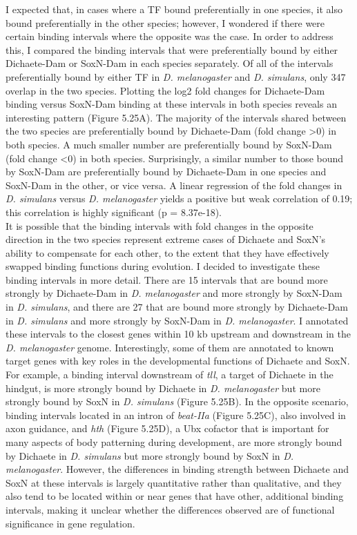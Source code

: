 I expected that, in cases where a TF bound preferentially in one species, it also bound preferentially in the other species; however, I wondered if there were certain binding intervals where the opposite was the case. In order to address this, I compared the binding intervals that were preferentially bound by either Dichaete-Dam or SoxN-Dam in each species separately. Of all of the intervals preferentially bound by either TF in \emph{D. melanogaster} and \emph{D. simulans}, only 347 overlap in the two species. Plotting the log2 fold changes for Dichaete-Dam binding versus SoxN-Dam binding at these intervals in both species reveals an interesting pattern (Figure 5.25A). The majority of the intervals shared between the two species are preferentially bound by Dichaete-Dam (fold change \textgreater 0) in both species. A much smaller number are preferentially bound by SoxN-Dam (fold change \textless 0) in both species. Surprisingly, a similar number to those bound by SoxN-Dam are preferentially bound by Dichaete-Dam in one species and SoxN-Dam in the other, or vice versa. A linear regression of the fold changes in \emph{D. simulans} versus \emph{D. melanogaster} yields a positive but weak correlation of 0.19; this correlation is highly significant (p = 8.37e-18).\\

It is possible that the binding intervals with fold changes in the opposite direction in the two species represent extreme cases of Dichaete and SoxN’s ability to compensate for each other, to the extent that they have effectively swapped binding functions during evolution. I decided to investigate these binding intervals in more detail. There are 15 intervals that are bound more strongly by Dichaete-Dam in \emph{D. melanogaster} and more strongly by SoxN-Dam in \emph{D. simulans}, and there are 27 that are bound more strongly by Dichaete-Dam in \emph{D. simulans} and more strongly by SoxN-Dam in \emph{D. melanogaster}. I annotated these intervals to the closest genes within 10 kb upstream and downstream in the \emph{D. melanogaster} genome. Interestingly, some of them are annotated to known target genes with key roles in the developmental functions of Dichaete and SoxN. For example, a binding interval downstream of \emph{tll}, a target of Dichaete in the hindgut, is more strongly bound by Dichaete in \emph{D. melanogaster} but more strongly bound by SoxN in \emph{D. simulans} (Figure 5.25B). In the opposite scenario, binding intervals located in an intron of \emph{beat-IIa} (Figure 5.25C), also involved in axon guidance, and \emph{hth} (Figure 5.25D), a Ubx cofactor that is important for many aspects of body patterning during development, are more strongly bound by Dichaete in \emph{D. simulans} but more strongly bound by SoxN in \emph{D. melanogaster}. However, the differences in binding strength between Dichaete and SoxN at these intervals is largely quantitative rather than qualitative, and they also tend to be located within or near genes that have other, additional binding intervals, making it unclear whether the differences observed are of functional significance in gene regulation.\\

